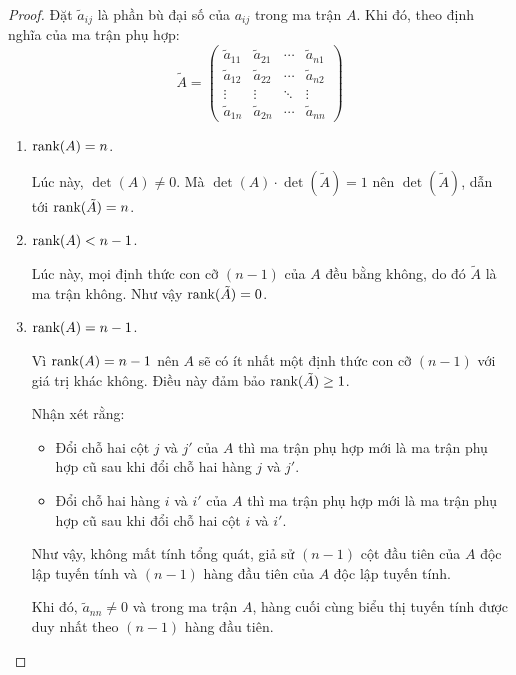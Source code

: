 \documentclass[class=linearalgebra,crop=false]{standalone}
\begin{document}
\begin{proof}
    \par Đặt $\tilde{a}_{ij}$ là phần bù đại số của $a_{ij}$ trong ma trận $A$. Khi đó, theo định nghĩa của ma trận phụ hợp:
    \[
        \tilde{A} =
        \begin{pmatrix}
            \tilde{a}_{11} & \tilde{a}_{21} & \cdots & \tilde{a}_{n1} \\
            \tilde{a}_{12} & \tilde{a}_{22} & \cdots & \tilde{a}_{n2} \\
            \vdots         & \vdots         & \ddots & \vdots         \\
            \tilde{a}_{1n} & \tilde{a}_{2n} & \cdots & \tilde{a}_{nn}
        \end{pmatrix}
    \]
    \begin{enumerate}[label = \textbf{Trường hợp \arabic*.},itemindent=2cm]
        \item $\text{rank}(A) = n$.
              \par Lúc này, $\det(A)\ne 0$. Mà $\det(A)\cdot\det(\tilde{A}) = 1$ nên $\det(\tilde{A})$, dẫn tới $\text{rank}(\tilde{A}) = n$.
        \item $\text{rank}(A) < n - 1$.
              \par Lúc này, mọi định thức con cỡ $(n-1)$ của $A$ đều bằng không, do đó $\tilde{A}$ là ma trận không. Như vậy $\text{rank}(\tilde{A}) = 0$.
        \item $\text{rank}(A) = n - 1$.
              \par Vì $\text{rank}(A) = n - 1$ nên $A$ sẽ có ít nhất một định thức con cỡ $(n-1)$ với giá trị khác không. Điều này đảm bảo $\text{rank}(\tilde{A})\ge 1$.
              \par Nhận xét rằng:
              \begin{itemize}
                  \item Đổi chỗ hai cột $j$ và $j'$ của $A$ thì ma trận phụ hợp mới là ma trận phụ hợp cũ sau khi đổi chỗ hai hàng $j$ và $j'$.
                  \item Đổi chỗ hai hàng $i$ và $i'$ của $A$ thì ma trận phụ hợp mới là ma trận phụ hợp cũ sau khi đổi chỗ hai cột $i$ và $i'$.
              \end{itemize}
              \par Như vậy, không mất tính tổng quát, giả sử $(n-1)$ cột đầu tiên của $A$ độc lập tuyến tính và $(n-1)$ hàng đầu tiên của $A$ độc lập tuyến tính.
              \par Khi đó, $\tilde{a}_{nn}\ne 0$ và trong ma trận $A$, hàng cuối cùng biểu thị tuyến tính được duy nhất theo $(n-1)$ hàng đầu tiên.

\end{enumerate}
\end{proof}
\end{document}
